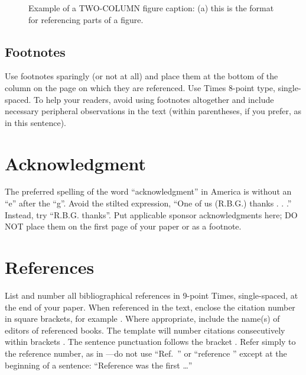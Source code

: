 \documentclass[conference,a4paper,flushend]{neutr}
\begin{document}
\begin{figure}[htbp]
    \centering
    \quad
    \caption{Example of a TWO-COLUMN figure caption: (a) this is the format for referencing parts of a figure.}
\end{figure}

\subsection{Footnotes}
Use footnotes sparingly (or not at all) and place them at the bottom of the column on the page on which they are referenced. Use Times 8-point type, single-spaced. To help your readers, avoid using footnotes altogether and include necessary peripheral observations in the text (within parentheses, if you prefer, as in this sentence).

\section*{Acknowledgment}
The preferred spelling of the word “acknowledgment” in America is without an “e” after the “g”. Avoid the stilted expression, “One of us (R.B.G.) thanks . . .”  Instead, try 
“R.B.G. thanks”. Put applicable sponsor acknowledgments here; DO NOT place them on the first page of your paper or as a footnote.

\section*{References}
List and number all bibliographical references in 9-point Times, single-spaced, at the end of your paper. When referenced in the text, enclose the citation number in square brackets, for example \cite{eason1955certain}. Where appropriate, include the name(s) of editors of referenced books. The template will number citations consecutively within brackets \cite{eason1955certain}. The sentence punctuation follows the bracket \cite{maxwell1873treatise}. Refer simply to the reference number, as in \cite{jacobs1963fine}—do not use “Ref.\ \cite{jacobs1963fine}” or “reference \cite{jacobs1963fine}” except at the beginning of a sentence: “Reference \cite{jacobs1963fine} was the first \ldots”
\end{document}
